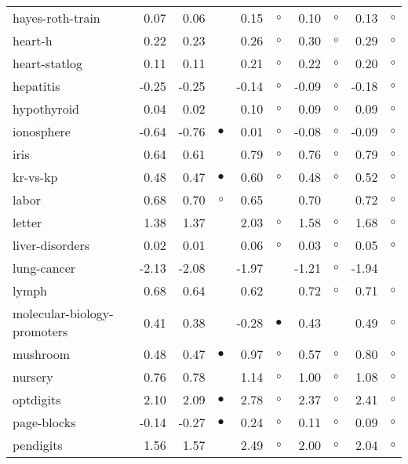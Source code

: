 {\begin{longtable}{lrr@{\hspace{0.1cm}}cr@{\hspace{0.1cm}}cr@{\hspace{0.1cm}}cr@{\hspace{0.1cm}}c}
hayes-roth-train &  0.07 &  0.06 &           &  0.15 &   $\circ$ &  0.10 &   $\circ$ &  0.13 &   $\circ$\\
heart-h &  0.22 &  0.23 &           &  0.26 &   $\circ$ &  0.30 &   $\circ$ &  0.29 &   $\circ$\\
heart-statlog &  0.11 &  0.11 &           &  0.21 &   $\circ$ &  0.22 &   $\circ$ &  0.20 &   $\circ$\\
hepatitis & -0.25 & -0.25 &           & -0.14 &   $\circ$ & -0.09 &   $\circ$ & -0.18 &   $\circ$\\
hypothyroid &  0.04 &  0.02 &           &  0.10 &   $\circ$ &  0.09 &   $\circ$ &  0.09 &   $\circ$\\
ionosphere & -0.64 & -0.76 & $\bullet$ &  0.01 &   $\circ$ & -0.08 &   $\circ$ & -0.09 &   $\circ$\\
iris &  0.64 &  0.61 &           &  0.79 &   $\circ$ &  0.76 &   $\circ$ &  0.79 &   $\circ$\\
kr-vs-kp &  0.48 &  0.47 & $\bullet$ &  0.60 &   $\circ$ &  0.48 &   $\circ$ &  0.52 &   $\circ$\\
labor &  0.68 &  0.70 &   $\circ$ &  0.65 &           &  0.70 &           &  0.72 &   $\circ$\\
letter &  1.38 &  1.37 &           &  2.03 &   $\circ$ &  1.58 &   $\circ$ &  1.68 &   $\circ$\\
liver-disorders &  0.02 &  0.01 &           &  0.06 &   $\circ$ &  0.03 &   $\circ$ &  0.05 &   $\circ$\\
lung-cancer & -2.13 & -2.08 &           & -1.97 &           & -1.21 &   $\circ$ & -1.94 &          \\
lymph &  0.68 &  0.64 &           &  0.62 &           &  0.72 &   $\circ$ &  0.71 &   $\circ$\\
molecular-biology-promoters &  0.41 &  0.38 &           & -0.28 & $\bullet$ &  0.43 &           &  0.49 &   $\circ$\\
mushroom &  0.48 &  0.47 & $\bullet$ &  0.97 &   $\circ$ &  0.57 &   $\circ$ &  0.80 &   $\circ$\\
nursery &  0.76 &  0.78 &           &  1.14 &   $\circ$ &  1.00 &   $\circ$ &  1.08 &   $\circ$\\
optdigits &  2.10 &  2.09 & $\bullet$ &  2.78 &   $\circ$ &  2.37 &   $\circ$ &  2.41 &   $\circ$\\
page-blocks & -0.14 & -0.27 & $\bullet$ &  0.24 &   $\circ$ &  0.11 &   $\circ$ &  0.09 &   $\circ$\\
pendigits &  1.56 &  1.57 &           &  2.49 &   $\circ$ &  2.00 &   $\circ$ &  2.04 &   $\circ$\\

\end{longtable}}
